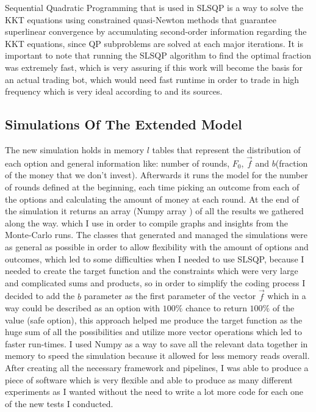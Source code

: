 \documentclass{article}
\begin{document}
	\newline
	Sequential Quadratic Programming that is used in SLSQP is a way to solve the KKT equations using constrained quasi-Newton methods that guarantee superlinear convergence by accumulating second-order information regarding the KKT equations, since QP subproblems are solved at each major iterations.
	\newline\newline
	It is important to note that running the SLSQP algorithm to find the optimal fraction was extremely fast, which is very assuring if this work will become the basis for an actual trading bot, which would need fast runtime in order to trade in high frequency which is very ideal according to \cite{Feng8388} and its sources.
	\subsection{Simulations Of The Extended Model}
	The new simulation holds in memory $l$ tables that represent the distribution of each option and general information like: number of rounds, $F_0$, $\overrightarrow{f}$ and $b$(fraction of the money that we don't invest). Afterwards it runs the model for the number of rounds defined at the beginning, each time picking an outcome from each of the options and calculating the amount of money at each round. At the end of the simulation it returns an array (Numpy array \cite{Numpy}) of all the results we gathered along the way.
	which I use in order to compile graphs and insights from the Monte-Carlo runs.
	The classes that generated and managed the simulations were as general as possible in order to allow flexibility with the amount of options and outcomes, which led to some difficulties when I needed to use SLSQP, because I needed to create the target function and the constraints which were very large and complicated sums and products, so in order to simplify the coding process I decided to add the $b$ parameter as the first parameter of the vector $\overrightarrow{f}$ which in a way could be described as an option with $100\%$ chance to return $100\%$ of the value (safe option), this approach helped me produce the target function as the huge sum of all the possibilities and utilize more vector operations which led to faster run-times. I used Numpy as a way to save all the relevant data together in memory to speed the simulation because it allowed for less memory reads overall.\newline
	After creating all the necessary framework and pipelines, I was able to produce a piece of software which is very flexible and able to produce as many different experiments as I wanted without the need to write a lot more code for each one of the new tests I conducted.\newline
	
\end{document}
